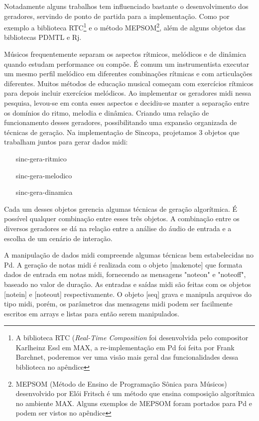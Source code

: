 \documentclass[draft]{ppgmus}
\begin{document}
Notadamente alguns trabalhos tem influenciado bastante o desenvolvimento
dos geradores, servindo de ponto de partida para a implementação. Como
por exemplo a biblioteca RTC\footnote{A biblioteca RTC (\textit{Real-Time Composition} 
foi desenvolvida pelo compositor Karlheinz Essl em MAX, a re-implementação
em Pd foi feita por Frank Barchnet, poderemos ver uma visão mais geral
das funcionalidades dessa biblioteca no apêndice} e o método MEPSOM\footnote{
MEPSOM (Método de Ensino de Programação Sônica para Músicos) desenvolvido por
Elói Fritsch é um método que ensina composição algorítmica no ambiente MAX. Alguns
exemplos de MEPSOM foram portados para Pd e podem ser vistos no apêndice}, além
de alguns objetos das bibliotecas PDMTL e Rj.  


Músicos frequentemente separam os aspectos rítmicos, melódicos e de dinâmica
quando estudam performance ou compõe. É comum um instrumentista executar um 
mesmo perfil melódico em diferentes combinações rítmicas e com articulações
diferentes. Muitos métodos de educação musical começam com exercícios rítmicos
para depois incluir exercícios melódicos. Ao implementar os geradores midi
nessa pesquisa, levou-se em conta esses aspectos e decidiu-se manter a separação
entre os domínios do ritmo, melodia e dinâmica. Criando uma relação de funcionamento
desses geradores, possibilitando uma expansão organizada de técnicas de geração.
Na implementação de Sincopa, projetamos 3 objetos que trabalham juntos para
gerar dados midi: 

\begin{itemize}
 \item   [sinc-gera-ritmico]
 \item   [sinc-gera-melodico]
 \item   [sinc-gera-dinamica]
\end{itemize}

Cada um desses objetos gerencia algumas técnicas de geração
algorítmica. É possível qualquer combinação entre esses três objetos.
A combinação entre os diversos geradores se dá na relação entre a 
análise do áudio de entrada e a escolha de um cenário de interação. 

A manipulação de dados midi compreende algumas técnicas bem estabelecidas
no Pd. A geração de notas midi é realizada com o objeto [makenote] que formata
dados de entrada em notas midi, fornecendo as mensagens "noteon" e "noteoff", baseado
no valor de duração. As entradas e saídas midi são feitas com os objetos
[notein] e [noteout] respectivamente. O objeto [seq] grava e manipula arquivos 
do tipo midi, porém, os parâmetros das mensagens midi podem ser facilmente escritos
em arrays e listas para então serem manipulados.
\end{document}
